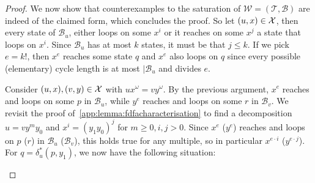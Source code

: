 \documentclass[a4paper,USenglish,cleveref,autoref,thm-restate]{lipics-v2021}
\newcommand{\mc}[1]{\ensuremath{\mathcal{#1}}}
\newcommand{\T}{\mc{T}}
\newcommand{\B}{\mc{B}}
\newcommand{\W}{\mc{W}}
\newcommand{\eps}{\ensuremath{\varepsilon}}
\begin{document}
{\begin{proof}
  We now show that counterexamples to the saturation of $\W = (\T, \B)$ are indeed of the claimed form, which concludes the proof.
  So let $(u,x) \in \mathcal{X}$, then every state of $\B_u$, either loops on some $x^i$ or it reaches on some $x^j$ a state that loops on $x^i$.
  Since $\B_u$ has at most $k$ states, it must be that $j \leq k$.
  If we pick $e = k!$, then $x^e$ reaches some state $q$ and $x^e$ also loops on $q$ since every possible (elementary) cycle length is at most $|\B_u$ and divides $e$.

  Consider $(u,x),(v,y) \in \mathcal{X}$ with $ux^\omega = vy^\omega$.
  By the previous argument, $x^e$ reaches and loops on some $p$ in $\B_u$, while $y^e$ reaches and loops on some $r$ in $\B_v$.
  We revisit the proof of~\cref{app:lemma:fdfacharacterisation} to find a decomposition $u = vy^my_0$ and $x^i = (y_1y_0)^j$ for $m \geq 0, i,j > 0$.
  Since $x^e$ ($y^e$) reaches and loops on $p$ ($r$) in $\B_u$ ($\B_v$), this holds true for any multiple, so in particular $x^{e\cdot i}$ ($y^{e\cdot j}$).
  For $q = \delta^*_u(p, y_1)$, we now have the following situation:
  \begin{center}
\end{center}
\end{proof}}
\end{document}
